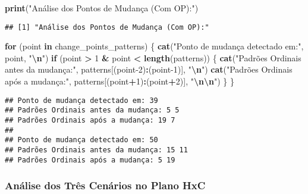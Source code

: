 \documentclass[
]{article}
\newenvironment{Shaded}{\begin{snugshade}}{\end{snugshade}}
\newcommand{\ControlFlowTok}[1]{\textcolor[rgb]{0.13,0.29,0.53}{\textbf{#1}}}
\newcommand{\DecValTok}[1]{\textcolor[rgb]{0.00,0.00,0.81}{#1}}
\newcommand{\FunctionTok}[1]{\textcolor[rgb]{0.13,0.29,0.53}{\textbf{#1}}}
\newcommand{\NormalTok}[1]{#1}
\newcommand{\SpecialCharTok}[1]{\textcolor[rgb]{0.81,0.36,0.00}{\textbf{#1}}}
\newcommand{\StringTok}[1]{\textcolor[rgb]{0.31,0.60,0.02}{#1}}
\begin{document}
\begin{Shaded}
\begin{Highlighting}[]
\FunctionTok{print}\NormalTok{(}\StringTok{"Análise dos Pontos de Mudança (Com OP):"}\NormalTok{)}
\end{Highlighting}
\end{Shaded}

\begin{verbatim}
## [1] "Análise dos Pontos de Mudança (Com OP):"
\end{verbatim}

\begin{Shaded}
\begin{Highlighting}[]
\ControlFlowTok{for}\NormalTok{ (point }\ControlFlowTok{in}\NormalTok{ change\_points\_patterns) \{}
  \FunctionTok{cat}\NormalTok{(}\StringTok{"Ponto de mudança detectado em:"}\NormalTok{, point, }\StringTok{"}\SpecialCharTok{\textbackslash{}n}\StringTok{"}\NormalTok{)}
  \ControlFlowTok{if}\NormalTok{ (point }\SpecialCharTok{\textgreater{}} \DecValTok{1} \SpecialCharTok{\&}\NormalTok{ point }\SpecialCharTok{\textless{}} \FunctionTok{length}\NormalTok{(patterns)) \{}
    \FunctionTok{cat}\NormalTok{(}\StringTok{"Padrões Ordinais antes da mudança:"}\NormalTok{, patterns[(point}\DecValTok{{-}2}\NormalTok{)}\SpecialCharTok{:}\NormalTok{(point}\DecValTok{{-}1}\NormalTok{)], }\StringTok{"}\SpecialCharTok{\textbackslash{}n}\StringTok{"}\NormalTok{)}
    \FunctionTok{cat}\NormalTok{(}\StringTok{"Padrões Ordinais após a mudança:"}\NormalTok{, patterns[(point}\SpecialCharTok{+}\DecValTok{1}\NormalTok{)}\SpecialCharTok{:}\NormalTok{(point}\SpecialCharTok{+}\DecValTok{2}\NormalTok{)], }\StringTok{"}\SpecialCharTok{\textbackslash{}n\textbackslash{}n}\StringTok{"}\NormalTok{)}
\NormalTok{  \}}
\NormalTok{\}}
\end{Highlighting}
\end{Shaded}

\begin{verbatim}
## Ponto de mudança detectado em: 39 
## Padrões Ordinais antes da mudança: 5 5 
## Padrões Ordinais após a mudança: 19 7 
## 
## Ponto de mudança detectado em: 50 
## Padrões Ordinais antes da mudança: 15 11 
## Padrões Ordinais após a mudança: 5 19
\end{verbatim}

\hypertarget{anuxe1lise-dos-truxeas-cenuxe1rios-no-plano-hxc}{%
\subsubsection{Análise dos Três Cenários no Plano
HxC}\label{anuxe1lise-dos-truxeas-cenuxe1rios-no-plano-hxc}}
\end{document}
